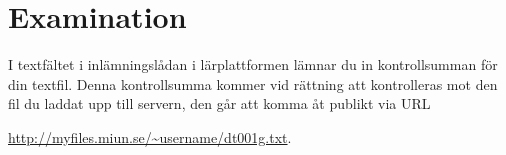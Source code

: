 \documentclass[a4paper,nocourse]{miunasgn}
\begin{document}
\section{Examination}
\label{sec:Examination}
\noindent
I textfältet i inlämningslådan i lärplattformen lämnar du in kontrollsumman för 
din textfil.
Denna kontrollsumma kommer vid rättning att kontrolleras mot den fil du laddat 
upp till servern, den går att komma åt publikt via URL
\begin{center}
	\url{http://myfiles.miun.se/~username/dt001g.txt}.
\end{center}



\end{document}
